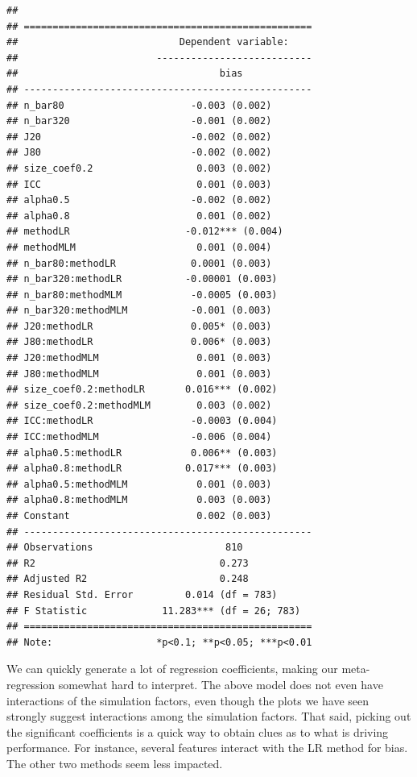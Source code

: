 \documentclass[
]{book}
\begin{document}
\begin{verbatim}
## 
## ==================================================
##                            Dependent variable:    
##                        ---------------------------
##                                   bias            
## --------------------------------------------------
## n_bar80                      -0.003 (0.002)       
## n_bar320                     -0.001 (0.002)       
## J20                          -0.002 (0.002)       
## J80                          -0.002 (0.002)       
## size_coef0.2                  0.003 (0.002)       
## ICC                           0.001 (0.003)       
## alpha0.5                     -0.002 (0.002)       
## alpha0.8                      0.001 (0.002)       
## methodLR                    -0.012*** (0.004)     
## methodMLM                     0.001 (0.004)       
## n_bar80:methodLR             0.0001 (0.003)       
## n_bar320:methodLR           -0.00001 (0.003)      
## n_bar80:methodMLM            -0.0005 (0.003)      
## n_bar320:methodMLM           -0.001 (0.003)       
## J20:methodLR                 0.005* (0.003)       
## J80:methodLR                 0.006* (0.003)       
## J20:methodMLM                 0.001 (0.003)       
## J80:methodMLM                 0.001 (0.003)       
## size_coef0.2:methodLR       0.016*** (0.002)      
## size_coef0.2:methodMLM        0.003 (0.002)       
## ICC:methodLR                 -0.0003 (0.004)      
## ICC:methodMLM                -0.006 (0.004)       
## alpha0.5:methodLR            0.006** (0.003)      
## alpha0.8:methodLR           0.017*** (0.003)      
## alpha0.5:methodMLM            0.001 (0.003)       
## alpha0.8:methodMLM            0.003 (0.003)       
## Constant                      0.002 (0.003)       
## --------------------------------------------------
## Observations                       810            
## R2                                0.273           
## Adjusted R2                       0.248           
## Residual Std. Error         0.014 (df = 783)      
## F Statistic             11.283*** (df = 26; 783)  
## ==================================================
## Note:                  *p<0.1; **p<0.05; ***p<0.01
\end{verbatim}

We can quickly generate a lot of regression coefficients, making our meta-regression somewhat hard to interpret.
The above model does not even have interactions of the simulation factors, even though the plots we have seen strongly suggest interactions among the simulation factors.
That said, picking out the significant coefficients is a quick way to obtain clues as to what is driving performance.
For instance, several features interact with the LR method for bias.
The other two methods seem less impacted.
\end{document}
